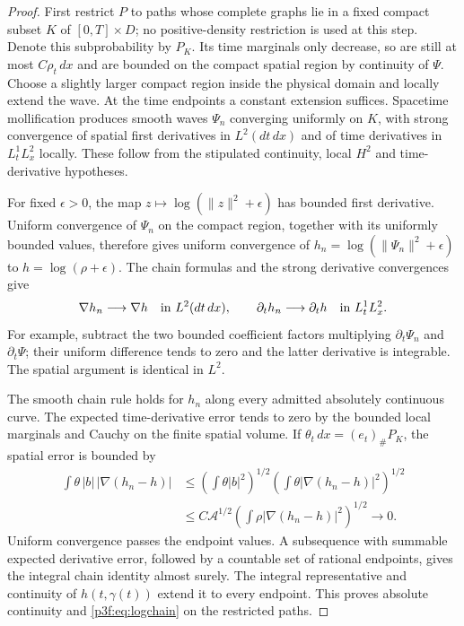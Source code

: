 \documentclass[11pt]{article}
\numberwithin{equation}{section}
\theoremstyle{definition}
\theoremstyle{remark}
\begin{document}
\begin{proof}
First restrict $P$ to paths whose complete graphs lie in a fixed
compact subset $K$ of $[0,T]\times D$; no positive-density restriction
is used at this step. Denote this subprobability by $P_K$. Its time
marginals only decrease, so are still at most $C\rho_t\,dx$ and are
bounded on the compact spatial region by continuity of $\Psi$.
Choose a slightly larger compact region inside the physical domain
and locally extend the wave. At the time endpoints a constant
extension suffices. Spacetime mollification produces smooth waves
$\Psi_n$ converging uniformly on $K$, with strong convergence of
spatial first derivatives in $L^2(dt\,dx)$ and of time derivatives in
$L^1_tL^2_x$ locally. These follow from the stipulated continuity,
local $H^2$ and time-derivative hypotheses.

For fixed $\epsilon>0$, the map
$z\mapsto\log(\|z\|^2+\epsilon)$ has bounded first derivative.
Uniform convergence of $\Psi_n$ on the compact region, together
with its uniformly bounded values, therefore gives uniform convergence
of $h_n=\log(\|\Psi_n\|^2+\epsilon)$ to
$h=\log(\rho+\epsilon)$. The chain formulas and the strong derivative
convergences give
\[
 \nabla h_n\longrightarrow\nabla h\quad\hbox{in }L^2(dt\,dx),
 \qquad
 \partial_t h_n\longrightarrow\partial_t h
                  \quad\hbox{in }L^1_tL^2_x.
\]
For example, subtract the two bounded coefficient factors multiplying
$\partial_t\Psi_n$ and $\partial_t\Psi$; their uniform difference
tends to zero and the latter derivative is integrable. The spatial
argument is identical in $L^2$.

The smooth chain rule holds for $h_n$ along every admitted
absolutely continuous curve. The expected time-derivative error tends
to zero by the bounded local marginals and Cauchy on the finite
spatial volume. If $\theta_t\,dx=(e_t)_\#P_K$, the spatial error is
bounded by
\begin{align*}
 \int\theta\,|b|\,|\nabla(h_n-h)|
 &\leq
 \left(\int\theta|b|^2\right)^{1/2}
 \left(\int\theta|\nabla(h_n-h)|^2\right)^{1/2}\\
 &\leq C\mathcal A^{1/2}
       \left(\int\rho|\nabla(h_n-h)|^2\right)^{1/2}
 \longrightarrow0 .
\end{align*}
Uniform convergence passes the endpoint values. A subsequence with
summable expected derivative error, followed by a countable set of
rational endpoints, gives the integral chain identity almost surely.
The integral representative and continuity of $h(t,\gamma(t))$
extend it to every endpoint. This proves absolute continuity and
\eqref{p3f:eq:logchain} on the restricted paths.


\end{proof}
\end{document}
